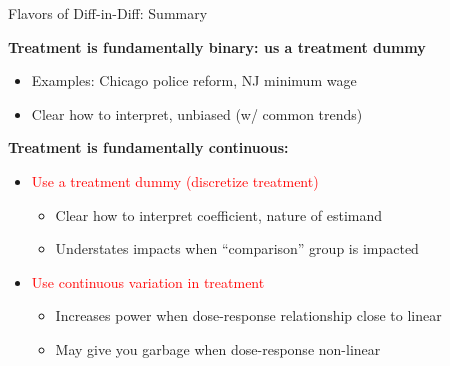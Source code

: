 \documentclass[10pt,xcolor=table,ignorenonframetext,aspectratio=169]{beamer}
\newlength{\wideitemsep}
\let\olditem\item
\renewcommand{\item}{\setlength{\itemsep}{\wideitemsep}\olditem}
\begin{document}

\begin{frame}{Flavors of Diff-in-Diff:  Summary}

\medskip
\textbf{Treatment is fundamentally binary:  us a treatment dummy}

\medskip
\begin{itemize}
	
	\item Examples:  Chicago police reform, NJ minimum wage
	
	\item Clear how to interpret, unbiased (w/ common trends)
	
\end{itemize}

\medskip
\textbf{Treatment is fundamentally continuous:  }

\medskip
\begin{itemize}
	
	\item \textcolor{red}{Use a treatment dummy (discretize treatment)}
	
	\medskip
	\begin{itemize}
		
		\item Clear how to interpret coefficient, nature of estimand
		
		\item Understates impacts when ``comparison'' group is impacted 
		
	\end{itemize}
	
	\item \textcolor{red}{Use continuous variation in treatment}
	
	\medskip
	\begin{itemize}
		
		\item Increases power when dose-response relationship close to linear
		
		\item May give you garbage when dose-response non-linear
		
%			
%			
		
	\end{itemize}
	
\end{itemize}


\end{frame}
\end{document}
